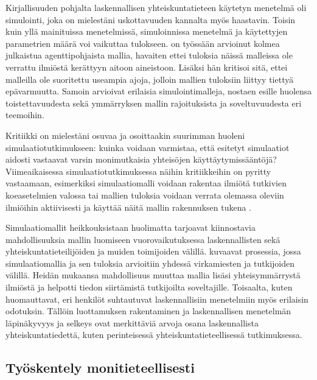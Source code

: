 \documentclass[finnish,gradu,twoside,12pt]{tktltiki}
\begin{document}
{Kirjallisuuden pohjalta laskennallisen yhteiskuntatieteen käytetyn menetelmä oli simulointi, joka on mielestäni uskottavuuden kannalta myös haastavin. Toisin kuin yllä mainituissa menetelmissä, simuloinnissa menetelmä ja käytettyjen parametrien määrä voi vaikuttaa tulokseen. \citet{bloomquist2006comparison} on työssään arvioinut kolmea julkaistua agenttipohjaista mallia, havaiten ettei tuloksia näissä malleissa ole verrattu ilmiöstä kerättyyn aitoon aineistoon. Lisäksi  hän kritisoi sitä, ettei malleilla ole suoritettu useampia ajoja, jolloin mallien tuloksiin liittyy tiettyä epävarmuutta. Samoin \citet{edmonds2005computational} arvioivat erilaisia simulointimalleja, nostaen esille huolensa toistettavuudesta sekä ymmärryksen mallin rajoituksista ja soveltuvuudesta eri teemoihin.

Kritiikki on mielestäni osuvaa ja osoittaakin suurimman huoleni simulaatiotutkimukseen: kuinka voidaan varmistaa, että esitetyt simulaatiot aidosti vastaavat varsin monimutkaisia yhteisöjen käyttäytymissääntöjä? Viimeaikaisessa simulaatiotutkimuksessa näihin kritiikkeihin on pyritty vastaamaan, esimerkiksi simulaatiomalli voidaan rakentaa ilmiötä tutkivien koeasetelmien valossa \citep{Villatoro2013} tai mallien tuloksia voidaan verrata olemassa oleviin ilmiöihin aktiivisesti ja käyttää näitä mallin rakennuksen tukena \citep{Pearson2011}.

Simulaatiomallit heikkouksistaan huolimatta tarjoavat kiinnostavia mahdollisuuksia mallin luomiseen vuorovaikutuksessa laskennallisten sekä yhteiskuntatieteilijöiden ja muiden toimijoiden välillä. \citet{Milne2014} kuvaavat prosessia, jossa simulaatiomallia ja sen tuloksia arvioitiin yhdessä virkamiesten ja tutkijoiden välillä. Heidän mukaansa mahdollisuus muuttaa mallia lisäsi yhteisymmärrystä ilmiöstä ja helpotti tiedon siirtämistä tutkijoilta soveltajille. Toisaalta, kuten \citet{Saunders-Newton2001a} huomauttavat, eri henkilöt suhtautuvat laskennallisiin menetelmiin myös erilaisin odotuksin. Tällöin luottamuksen rakentaminen ja laskennallisen menetelmän läpinäkyvyys ja selkeys ovat merkittäviä arvoja osana laskennallista yhteiskuntatiedettä, kuten perinteisessä yhteiskuntatieteellisessä tutkimuksessa.

\subsection{Työskentely monitieteellisesti}

\begin{figure}


\end{figure}}
\end{document}
